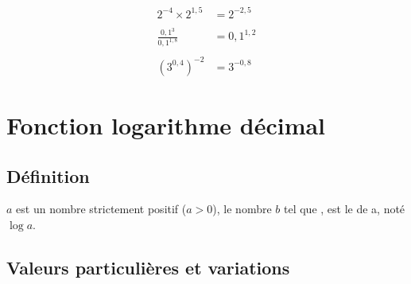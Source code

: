 \documentclass[xcolor={dvipsnames}]{beamer}
\begin{document}
\begin{frame}
	\begin{myex}
		
		\begin{align*}
		2^{-4} \times 2^{1,5} &= 2^{-2,5}\\\\
		\frac{0,1^3}{0,1^{1,8}} &= 0,1^{1,2}\\\\
		(3^{0,4})^{-2} &= 3^{-0,8}
		\end{align*}
	\end{myex}
\end{frame}


\section{Fonction logarithme décimal}

\subsection{Définition}

\begin{frame}
	\begin{mydef}
		$a$ est un nombre strictement positif ($a>0$), le nombre $b$ tel que , est le  de a, noté $\log a$.
	\end{mydef}
\end{frame}


\subsection{Valeurs particulières et variations}
\end{document}
